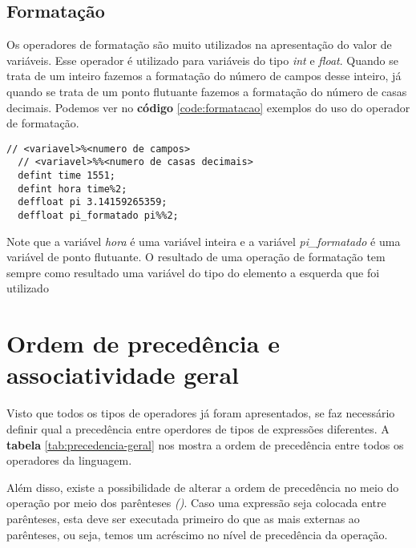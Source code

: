 \documentclass[
  12pt,				%
  oneside,			%
  a4paper,			%
  english,			%
  french,				%
  spanish,			%
  brazil,				%
]{abntex2}
\begin{document}
\subsection{Formatação}
\label{subsec:formatacao}
Os operadores de formatação são muito utilizados na apresentação do
valor de variáveis. Esse operador é utilizado para variáveis do tipo
\emph{int} e \emph{float}. Quando se trata de um inteiro fazemos a
formatação do número de campos desse inteiro, já quando se trata de um
ponto flutuante fazemos a formatação do número de casas
decimais. Podemos ver no \textbf{código} \ref{code:formatacao}
exemplos do uso do operador de formatação.

\begin{lstlisting}[label=code:formatacao,caption=Exemplo do uso do
  operador de formatação]
  // <variavel>%<numero de campos>
  // <variavel>%%<numero de casas decimais>
  defint time 1551;
  defint hora time%2;
  deffloat pi 3.14159265359;
  deffloat pi_formatado pi%%2;
\end{lstlisting}

Note que a variável \emph{hora} é uma variável inteira e a variável
\emph{pi\_formatado} é uma variável de ponto flutuante. O resultado de uma
operação de formatação tem sempre como resultado uma variável do tipo
do elemento a esquerda que foi utilizado



\section{Ordem de precedência e associatividade geral}
\label{sec:order-de-precedencia-e-associatividade-geral}

Visto que todos os tipos de operadores já foram apresentados, se faz
necessário definir qual a precedência entre operdores de tipos de
expressões diferentes. A \textbf{tabela} \ref{tab:precedencia-geral}
nos mostra a ordem de precedência entre todos os operadores da
linguagem.

Além disso, existe a possibilidade de alterar a ordem de precedência
no meio do operação por meio dos parênteses \emph{()}. Caso uma
expressão seja colocada entre parênteses, esta deve ser executada
primeiro do que as mais externas ao parênteses, ou seja, temos um
acréscimo no nível de precedência da operação.
\end{document}
